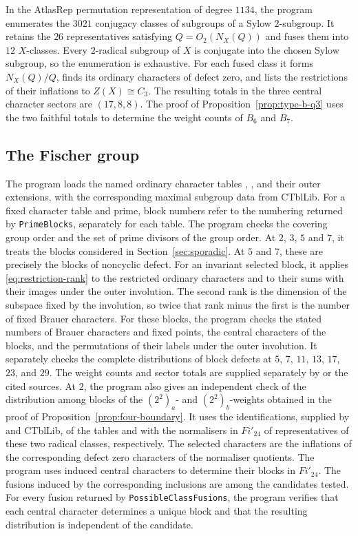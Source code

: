 \documentclass[10pt]{amsart}
\theoremstyle{definition}
\numberwithin{equation}{section}
\numberwithin{table}{section}
\begin{document}
In the AtlasRep permutation representation of degree $1134$, the
program  enumerates the
$3021$ conjugacy classes of subgroups of a Sylow $2$-subgroup.  It retains
the $26$ representatives satisfying
$Q=O_2(N_X(Q))$ and fuses them into $12$ $X$-classes.
Every $2$-radical subgroup of $X$ is conjugate into the chosen Sylow
subgroup, so the enumeration is exhaustive.  For each fused
class it forms $N_X(Q)/Q$, finds its ordinary characters of defect zero, and
lists the restrictions of their inflations to $Z(X)\cong C_3$.  The resulting totals in
the three central character sectors are $(17,8,8)$.
The proof of Proposition~\ref{prop:type-b-q3} uses the two faithful
totals to determine the weight counts of $B_6$ and $B_7$.

\subsection{The Fischer group}
\label{app:fischer}

The program  loads the named ordinary character
tables , , and their outer extensions, with the
corresponding maximal subgroup data from CTblLib.
For a fixed character table and prime, block numbers refer to the
numbering returned by \texttt{PrimeBlocks}, separately for each table.
The program checks the covering group order and the set of prime
divisors of the group order. At $2$, $3$, $5$ and $7$, it treats the blocks considered in
Section~\ref{sec:sporadic}. At $5$ and $7$, these are precisely the blocks of
noncyclic defect.  For an invariant selected block, it applies
\eqref{eq:restriction-rank} to the restricted
ordinary characters and to their sums with their images under the outer
involution. The second rank is the dimension of the subspace fixed by the
involution, so twice that rank minus the first is the number of fixed
Brauer characters.  For these blocks, the program checks the
stated numbers of Brauer characters and fixed points, the central
characters of the blocks, and the permutations of their labels under the
outer involution.  It separately checks the complete distributions of block defects at $5$, $7$, $11$, $13$, $17$, $23$, and $29$.  The weight
counts and sector totals are supplied separately by 
or the cited sources.
At $2$, the program  also gives an independent check
of the distribution among blocks of the $(2^2)_a$- and $(2^2)_b$-weights
obtained in the proof of Proposition~\ref{prop:four-boundary}.
It uses the identifications, supplied by \cite{AnCannonOBrienUngerFi24}
and CTblLib, of the tables  and
 with the normalisers in $Fi'_{24}$ of
representatives of these two radical classes, respectively.
The selected characters are the inflations of the corresponding defect
zero characters of the normaliser quotients. The program uses induced
central characters to determine their blocks in $Fi'_{24}$. The
fusions induced by the corresponding inclusions are among the candidates
tested. For every fusion returned by \texttt{PossibleClassFusions}, the
program verifies that each central character determines a unique block
and that the resulting distribution is independent of the candidate.
\end{document}
